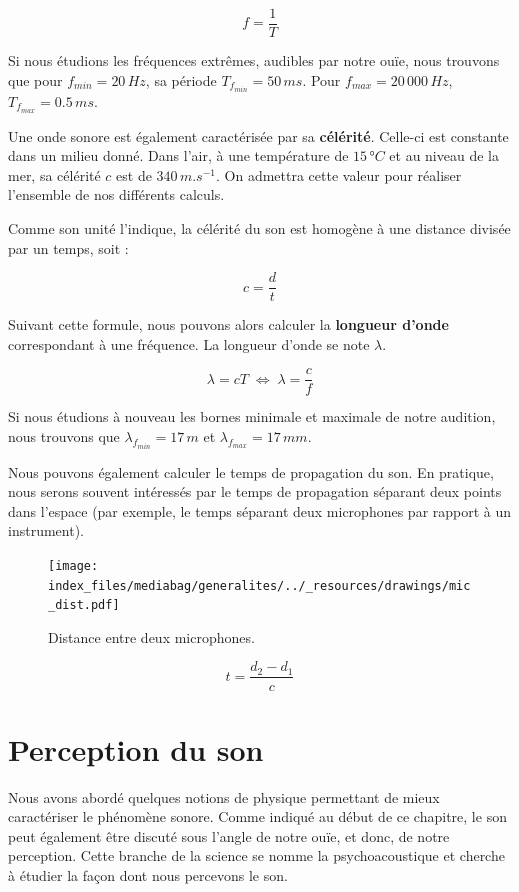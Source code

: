 \documentclass[
  letterpaper,
  DIV=11,
  numbers=noendperiod]{scrreprt}
\begin{document}
\[ f = \frac 1 T \]

Si nous étudions les fréquences extrêmes, audibles par notre ouïe, nous
trouvons que pour \(f_{min} = 20 \,Hz\), sa période
\(T_{f_{min}} = 50 \,ms\). Pour \(f_{max} = 20\,000 \,Hz\),
\(T_{f_{max}} = 0.5 \,ms\).

Une onde sonore est également caractérisée par sa \textbf{célérité}.
Celle-ci est constante dans un milieu donné. Dans l'air, à une
température de \(15 \,°C\) et au niveau de la mer, sa célérité \(c\) est
de \(340\,m.s^{-1}\). On admettra cette valeur pour réaliser l'ensemble
de nos différents calculs.

Comme son unité l'indique, la célérité du son est homogène à une
distance divisée par un temps, soit :

\[ c =\frac d t \]

Suivant cette formule, nous pouvons alors calculer la \textbf{longueur
d'onde} correspondant à une fréquence. La longueur d'onde se note
\(\lambda\).

\[ \lambda = cT \; \iff \; \lambda = \frac c f\]

Si nous étudions à nouveau les bornes minimale et maximale de notre
audition, nous trouvons que \(\lambda_{f_{min}} = 17 \,m\) et
\(\lambda_{f_{max}} = 17 \,mm\).

Nous pouvons également calculer le temps de propagation du son. En
pratique, nous serons souvent intéressés par le temps de propagation
séparant deux points dans l'espace (par exemple, le temps séparant deux
microphones par rapport à un instrument).

\begin{figure}

{\centering \texttt{[image: index\_files/mediabag/generalites/../\_resources/drawings/mic\_dist.pdf]}

}

\caption{\label{fig-dist_mic}Distance entre deux microphones.}

\end{figure}

\[ t = \frac {d_2-d_1}{c}\]

\hypertarget{perception-du-son}{%
\section{Perception du son}\label{perception-du-son}}

Nous avons abordé quelques notions de physique permettant de mieux
caractériser le phénomène sonore. Comme indiqué au début de ce chapitre,
le son peut également être discuté sous l'angle de notre ouïe, et donc,
de notre perception. Cette branche de la science se nomme la
psychoacoustique et cherche à étudier la façon dont nous percevons le
son.
\end{document}
